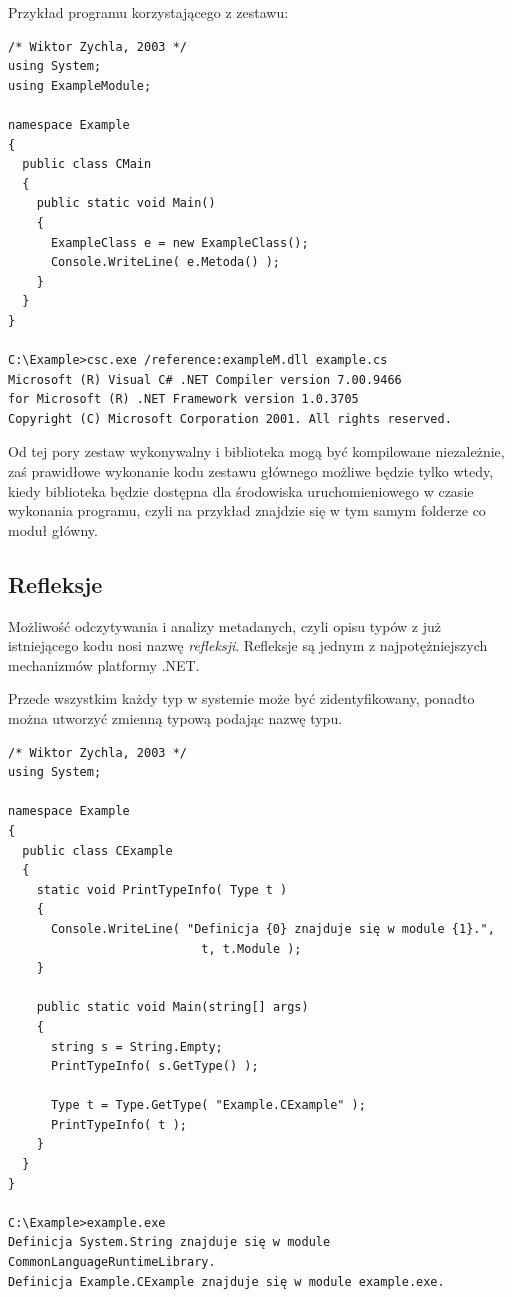 Przykład programu korzystającego z zestawu:

\begin{scriptsize}
\begin{verbatim}
/* Wiktor Zychla, 2003 */
using System;
using ExampleModule;

namespace Example
{ 
  public class CMain
  {    
    public static void Main()
    {
      ExampleClass e = new ExampleClass();
      Console.WriteLine( e.Metoda() );
    }
  }
}

C:\Example>csc.exe /reference:exampleM.dll example.cs
Microsoft (R) Visual C# .NET Compiler version 7.00.9466
for Microsoft (R) .NET Framework version 1.0.3705
Copyright (C) Microsoft Corporation 2001. All rights reserved.
\end{verbatim}
\end{scriptsize}

Od tej pory zestaw wykonywalny i biblioteka mogą być kompilowane niezależnie, zaś prawidłowe wykonanie kodu
zestawu głównego możliwe będzie tylko wtedy, kiedy biblioteka będzie dostępna dla środowiska uruchomieniowego
w czasie wykonania programu, czyli na przykład znajdzie się w tym samym folderze co moduł główny.

\subsection{Refleksje}

Możliwość odczytywania i analizy metadanych, czyli opisu typów z już istniejącego kodu nosi 
nazwę {\em refleksji}. Refleksje są jednym z najpotężniejszych mechanizmów platformy .NET.

Przede wszystkim każdy typ w systemie może być zidentyfikowany, ponadto można utworzyć zmienną 
typową podając nazwę typu.

\begin{scriptsize}
\begin{verbatim}
/* Wiktor Zychla, 2003 */
using System;

namespace Example
{
  public class CExample
  {
    static void PrintTypeInfo( Type t )
    {
      Console.WriteLine( "Definicja {0} znajduje się w module {1}.", 
                           t, t.Module );
    }

    public static void Main(string[] args)
    {
      string s = String.Empty;
      PrintTypeInfo( s.GetType() );

      Type t = Type.GetType( "Example.CExample" );
      PrintTypeInfo( t ); 
    }
  }
}

C:\Example>example.exe
Definicja System.String znajduje się w module CommonLanguageRuntimeLibrary.
Definicja Example.CExample znajduje się w module example.exe.
\end{verbatim}
\end{scriptsize}

